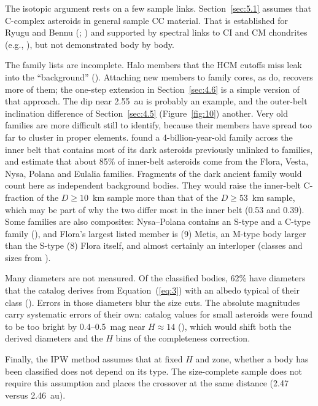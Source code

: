 \documentclass[twocolumn]{aastex701}
\begin{document}
The isotopic argument rests on a few sample links. Section~\ref{sec:5.1} assumes that C-complex asteroids in general sample CC material. That is established for Ryugu and Bennu (\citealt{yokoyama2023}; \citealt{lauretta2024}) and supported by spectral links to CI and CM chondrites (e.g., \citealt{rivkin2012}), but not demonstrated body by body.

The family lists are incomplete. Halo members that the HCM cutoffs miss leak into the “background” (\citealt{brozmorbidelli2013}). Attaching new members to family cores, as \citet{milani2014} do, recovers more of them; the one-step extension in Section~\ref{sec:4.6} is a simple version of that approach. The dip near 2.55~au is probably an example, and the outer-belt inclination difference of Section~\ref{sec:4.5} (Figure~\ref{fig:10}) another. Very old families are more difficult still to identify, because their members have spread too far to cluster in proper elements. \citet{delbo2017} found a 4-billion-year-old family across the inner belt that contains most of its dark asteroids previously unlinked to families, and \citet{dermott2018} estimate that about 85\% of inner-belt asteroids come from the Flora, Vesta, Nysa, Polana and Eulalia families. Fragments of the dark ancient family would count here as independent background bodies. They would raise the inner-belt C-fraction of the $D \geq 10$~km sample more than that of the $D \geq 53$~km sample, which may be part of why the two differ most in the inner belt (0.53 and 0.39). Some families are also composites: Nysa–Polana contains an S-type and a C-type family (\citealt{walsh2013}), and Flora’s largest listed member is (9) Metis, an \mbox{M-type} body larger than the S-type (8) Flora itself, and almost certainly an interloper (classes and sizes from \citealt{edwards2026b}).

Many diameters are not measured. Of the classified bodies, 62\% have diameters that the catalog derives from Equation~(\ref{eq:3}) with an albedo typical of their class (\citealt{edwards2026b}). Errors in those diameters blur the size cuts. The absolute magnitudes carry systematic errors of their own: catalog values for small asteroids were found to be too bright by 0.4–0.5~mag near $H \approx 14$ (\citealt{pravec2012}), which would shift both the derived diameters and the $H$ bins of the completeness correction.

Finally, the IPW method assumes that at fixed $H$ and zone, whether a body has been classified does not depend on its type. The size-complete sample does not require this assumption and places the crossover at the same distance (2.47 versus 2.46~au).
\end{document}
